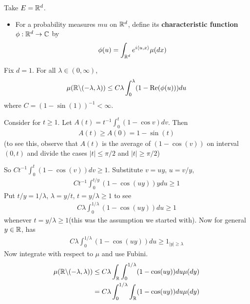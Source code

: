 \documentclass[12pt,a4paper]{report}
\newenvironment{proof}
{\begin{changemargin}{1cm}{0.5cm} 
	}%
	{\end{changemargin}
}
\begin{document}
Take $E = \mathbb{R}^d$. 
\begin{itemize}
\item For a probability measures $mu$ on $\mathbb{R}^d$, define its \textbf{characteristic function} $\phi : \mathbb{R}^d \rightarrow \mathbb{C}$ by
\begin{align*}
\phi(u) = \int_{\mathbb{R}^d} e^{i \langle u, x\rangle} \mu(dx)
\end{align*}
\end{itemize}
\s

 Fix $d=1$. For all $\lambda \in (0,\infty)$,
\begin{align*}
\mu(\mathbb{R} \backslash (-\lambda, \lambda)) \leq C\lambda \int_{0}^{\lambda} (1- \text{Re}(\phi(u))) du
\end{align*}
where $C = (1- \sin(1))^{-1} < \infty$.
\begin{proof}
\pf Consider for $t\geq 1$. Let $A(t) = t^{-1} \int_0^t (1-\cos v) dv$. Then
\begin{align*}
A(t) \geq A(0) = 1-\sin (t) 
\end{align*}
(to see this, observe that $A(t)$ is the average of $(1-\cos(v))$ on interval $(0,t)$ and divide the cases $|t| \leq \pi /2$ and $|t| \geq \pi/2$)

So $Ct^{-1} \int_0^t (1- \cos(v)) dv \geq 1$. Substitute $v = uy$, $u=v/y$,
\begin{align*}
Ct^{-1} \int_0^{t/y} (1- \cos(uy)) y du \geq 1
\end{align*}
Put $t/y = 1/\lambda$, $\lambda = y/t$, $t= y/\lambda \geq 1$ to see
\begin{align*}
C\lambda \int_{0}^{1/\lambda} (1- \cos (uy)) du \geq 1
\end{align*}
whenever $t=y/\lambda \geq 1$(this was the assumption we started with). Now for general $y \in \mathbb{R}$, has
\begin{align*}
C\lambda \int_{0}^{1/\lambda} (1- \cos (uy)) du \geq 1_{|y| \geq \lambda}
\end{align*}
Now integrate with respect to $\mu$ and use Fubini.
\begin{align*}
\mu(\mathbb{R} \backslash (-\lambda, \lambda)) &\leq C\lambda \int_{\mathbb{R}} \int_0^{1/\lambda} (1- \cos (uy)) du \mu(dy) \\
&= C\lambda \int_0^{1/\lambda} \int_{\mathbb{R}} (1- \cos(uy)) du \mu(dy)
\end{align*}

\eop
\end{proof}
\s

\newday
\end{document}
